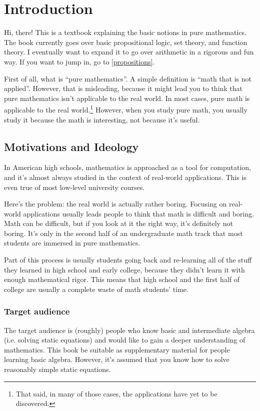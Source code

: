 \chapter{Introduction}

Hi, there! This is a textbook explaining the basic notions in pure
mathematics.  The book currently goes over basic propositional logic,
set theory, and function theory. I eventually want to expand it to go
over arithmetic in a rigorous and fun way.  If you want to jump in, go
to \cref{propositions}.

First of all, what is ``pure mathematics''. A simple definition is
``math that is not applied''. However, that is misleading, because it
might lead you to think that pure mathematics isn't applicable to the
real world. In most cases, pure math is applicable to the real
world.\footnote{That said, in many of those cases, the applications
  have yet to be discovered.} However, when you study pure math, you
usually study it because the math is interesting, not because it's
useful.

\section{Motivations and Ideology}

In American high schools, mathematics is approached as a tool for
computation, and it's almost always studied in the context of
real-world applications. This is even true of most low-level
university courses.

Here's the problem: the real world is actually rather boring. Focusing
on real-world applications usually leads people to think that math is
difficult and boring. Math can be difficult, but if you look at it the
right way, it's definitely not boring.  It's only in the second half
of an undergraduate math track that most students are immersed in pure
mathematics.

Part of this process is usually students going back and re-learning
all of the stuff they learned in high school and early college,
because they didn't learn it with enough mathematical rigor. This
means that high school and the first half of college are usually a
complete waste of math students' time.

\subsection{Target audience}

The target audience is (roughly) people who know basic and
intermediate algebra (i.e. solving static equations) and would like to
gain a deeper understanding of mathematics. This book  be
suitable as supplementary material for people learning basic algebra.
However, it's assumed that you know how to solve reasonably simple
static equations.

